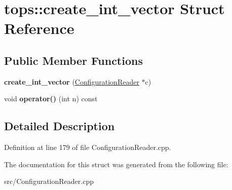 \hypertarget{structtops_1_1create__int__vector}{}\section{tops\+:\+:create\+\_\+int\+\_\+vector Struct Reference}
\label{structtops_1_1create__int__vector}
\subsection*{Public Member Functions}
\begin{DoxyCompactItemize}
\item 
\mbox{\label{structtops_1_1create__int__vector_af955cd453913fda791ae866f9d52ec01}} 
{\bfseries create\+\_\+int\+\_\+vector} (\hyperlink{classtops_1_1ConfigurationReader}{Configuration\+Reader} $\ast$c)
\item 
\mbox{\label{structtops_1_1create__int__vector_a9723e4370bdfe6c7350d032bb31f8d19}} 
void {\bfseries operator()} (int n) const
\end{DoxyCompactItemize}


\subsection{Detailed Description}


Definition at line 179 of file Configuration\+Reader.\+cpp.



The documentation for this struct was generated from the following file\+:\begin{DoxyCompactItemize}
\item 
src/Configuration\+Reader.\+cpp\end{DoxyCompactItemize}
